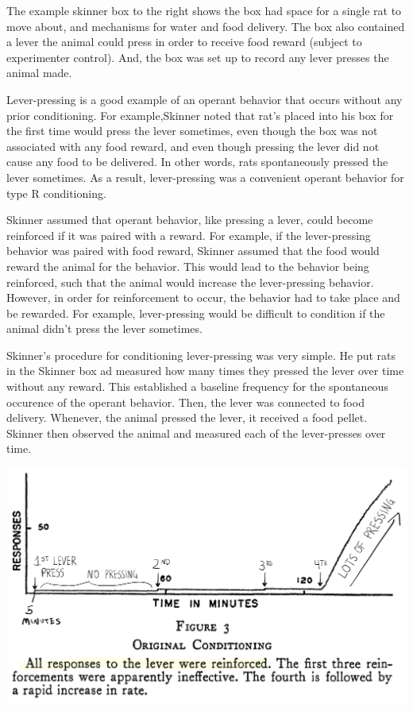 \documentclass[
  oneside,
  12pt]{crumpbook}
\newenvironment{floatright50}{%
  \wrapfigure{R}{.5\textwidth}%
  }{%
  \endwrapfigure}
\begin{document}
The example skinner box to the right shows the box had space for a single rat to move about, and mechanisms for water and food delivery. The box also contained a lever the animal could press in order to receive food reward (subject to experimenter control). And, the box was set up to record any lever presses the animal made.

Lever-pressing is a good example of an operant behavior that occurs without any prior conditioning. For example,Skinner noted that rat's placed into his box for the first time would press the lever sometimes, even though the box was not associated with any food reward, and even though pressing the lever did not cause any food to be delivered. In other words, rats spontaneously pressed the lever sometimes. As a result, lever-pressing was a convenient operant behavior for type R conditioning.

Skinner assumed that operant behavior, like pressing a lever, could become reinforced if it was paired with a reward. For example, if the lever-pressing behavior was paired with food reward, Skinner assumed that the food would reward the animal for the behavior. This would lead to the behavior being reinforced, such that the animal would increase the lever-pressing behavior. However, in order for reinforcement to occur, the behavior had to take place and be rewarded. For example, lever-pressing would be difficult to condition if the animal didn't press the lever sometimes.

Skinner's procedure for conditioning lever-pressing was very simple. He put rats in the Skinner box ad measured how many times they pressed the lever over time without any reward. This established a baseline frequency for the spontaneous occurence of the operant behavior. Then, the lever was connected to food delivery. Whenever, the animal pressed the lever, it received a food pellet. Skinner then observed the animal and measured each of the lever-presses over time.

\begin{floatright50}
\includegraphics[width=1\linewidth]{imgs/Skinner_Results}

\end{floatright50}
\end{document}
